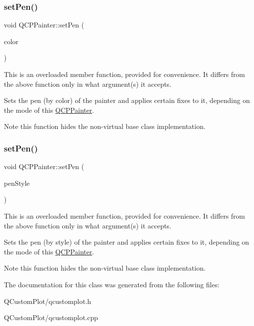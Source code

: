 \subsubsection{\texorpdfstring{set\+Pen()}{setPen()}\hspace{0.1cm}{\footnotesize\ttfamily [2/3]}}
{\footnotesize\ttfamily void Q\+C\+P\+Painter\+::set\+Pen (\begin{DoxyParamCaption}\item[{const Q\+Color \&}]{color }\end{DoxyParamCaption})}

This is an overloaded member function, provided for convenience. It differs from the above function only in what argument(s) it accepts.

Sets the pen (by color) of the painter and applies certain fixes to it, depending on the mode of this \mbox{\hyperlink{class_q_c_p_painter}{Q\+C\+P\+Painter}}.

\begin{DoxyNote}{Note}
this function hides the non-\/virtual base class implementation. 
\end{DoxyNote}
\mbox{\label{class_q_c_p_painter_a25e76095aae41da0d08035060e5f81ca}} 
\subsubsection{\texorpdfstring{set\+Pen()}{setPen()}\hspace{0.1cm}{\footnotesize\ttfamily [3/3]}}
{\footnotesize\ttfamily void Q\+C\+P\+Painter\+::set\+Pen (\begin{DoxyParamCaption}\item[{Qt\+::\+Pen\+Style}]{pen\+Style }\end{DoxyParamCaption})}

This is an overloaded member function, provided for convenience. It differs from the above function only in what argument(s) it accepts.

Sets the pen (by style) of the painter and applies certain fixes to it, depending on the mode of this \mbox{\hyperlink{class_q_c_p_painter}{Q\+C\+P\+Painter}}.

\begin{DoxyNote}{Note}
this function hides the non-\/virtual base class implementation. 
\end{DoxyNote}


The documentation for this class was generated from the following files\+:\begin{DoxyCompactItemize}
\item 
Q\+Custom\+Plot/qcustomplot.\+h\item 
Q\+Custom\+Plot/qcustomplot.\+cpp\end{DoxyCompactItemize}
